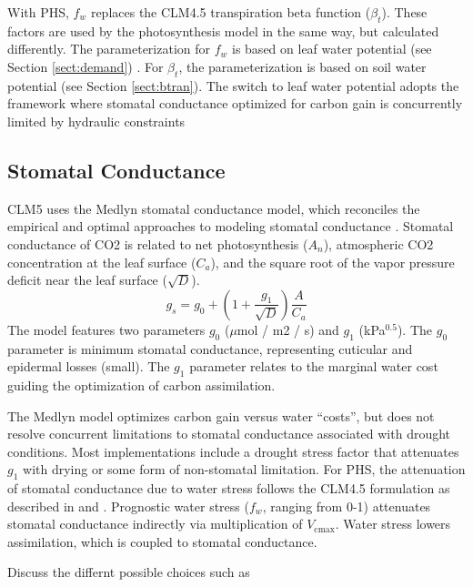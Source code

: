 \documentclass[draft,linenumbers]{agujournal}
\begin{document}
    With PHS, $f_w$ replaces the CLM4.5 transpiration beta function ($\beta_t$). 
    These factors are used by the photosynthesis model in the same way, but calculated differently. 
    The parameterization for $f_w$ is based on leaf water potential (see Section \ref{sect:demand}) . 
    For $\beta_t$, the parameterization is based on soil water potential (see Section \ref{sect:btran}).
    The switch to leaf water potential adopts the framework where stomatal conductance optimized for carbon gain is concurrently limited by hydraulic constraints \citep{novick2016a}


\subsection{Stomatal Conductance}
\label{sect:gs}
    CLM5 uses the Medlyn stomatal conductance model, which reconciles the empirical and optimal approaches to modeling 
    stomatal conductance \citep{medlyn2011}. 
    Stomatal conductance of CO2 is related to net photosynthesis ($A_n$), atmospheric CO2 concentration at the leaf surface 
    ($C_a$), and the square root of the vapor pressure deficit near the leaf surface ($\sqrt{D}$).
    \begin{equation}
    g_s=g_0+\left(1+\dfrac{g_1}{\sqrt{D}}\right)\dfrac{A}{C_a}
    \end{equation}
    The model features two parameters $g_0$ ($\mu$mol / m2 / s) and $g_1$ (kPa$^{0.5}$). 
    The $g_0$ parameter is minimum stomatal conductance, representing cuticular and epidermal losses (small). 
    The $g_1$ parameter relates to the marginal water cost guiding the optimization of carbon assimilation.
    
    The Medlyn model optimizes carbon gain versus water ``costs'', but does not resolve concurrent limitations to stomatal conductance
    associated with drought conditions.
    Most implementations include a drought stress factor that attenuates $g_1$ with drying or some form of non-stomatal limitation.
    For PHS, the attenuation of stomatal conductance due to water stress follows the CLM4.5 formulation as described in \citet{oleson2013} and \citet{bonan2011}. 
    Prognostic water stress ($f_w$, ranging from 0-1) attenuates stomatal conductance indirectly via multiplication of $V_{\text{cmax}}$.
    Water stress lowers assimilation, which is coupled to stomatal conductance.
    
    Discuss the differnt possible choices such as 

\end{document}

